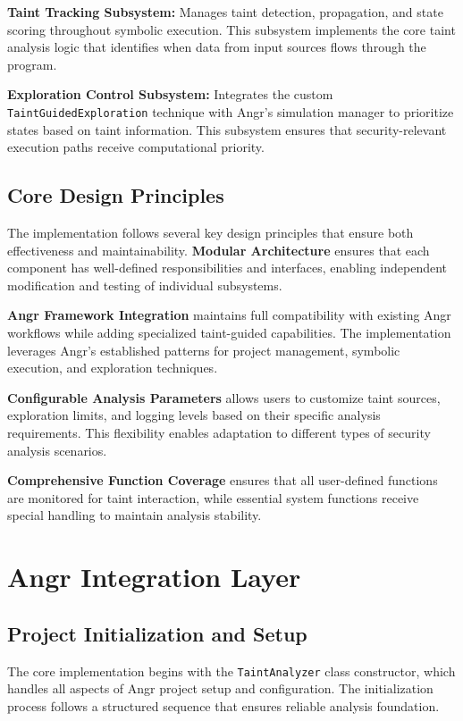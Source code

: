 \textbf{Taint Tracking Subsystem:} Manages taint detection, propagation, and state scoring throughout symbolic execution. This subsystem implements the core taint analysis logic that identifies when data from input sources flows through the program.

\textbf{Exploration Control Subsystem:} Integrates the custom \texttt{TaintGuidedExploration} technique with Angr's simulation manager to prioritize states based on taint information. This subsystem ensures that security-relevant execution paths receive computational priority.

\subsection{Core Design Principles}

The implementation follows several key design principles that ensure both effectiveness and maintainability. \textbf{Modular Architecture} ensures that each component has well-defined responsibilities and interfaces, enabling independent modification and testing of individual subsystems.

\textbf{Angr Framework Integration} maintains full compatibility with existing Angr workflows while adding specialized taint-guided capabilities. The implementation leverages Angr's established patterns for project management, symbolic execution, and exploration techniques.

\textbf{Configurable Analysis Parameters} allows users to customize taint sources, exploration limits, and logging levels based on their specific analysis requirements. This flexibility enables adaptation to different types of security analysis scenarios.

\textbf{Comprehensive Function Coverage} ensures that all user-defined functions are monitored for taint interaction, while essential system functions receive special handling to maintain analysis stability.

\section{Angr Integration Layer}\label{sec:angr_integration}

\subsection{Project Initialization and Setup}

The core implementation begins with the \texttt{TaintAnalyzer} class constructor, which handles all aspects of Angr project setup and configuration. The initialization process follows a structured sequence that ensures reliable analysis foundation.

